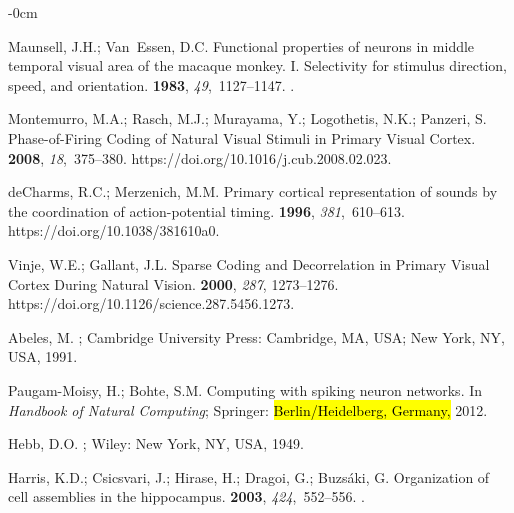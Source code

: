 \documentclass[brainsci, %
               review,accept,pdftex,moreauthors
               ]{Definitions/mdpi}
\begin{document}
\begin{adjustwidth}{-\extralength}{0cm}
\begin{thebibliography}{999}
Maunsell, J.H.; Van~Essen, D.C.
\newblock Functional properties of neurons in middle temporal visual area of
  the macaque monkey. {I}. {Selectivity} for stimulus direction, speed, and
  orientation.
 {\bf 1983}, {\em 49},~1127--1147.
.

Montemurro, M.A.; Rasch, M.J.; Murayama, Y.; Logothetis, N.K.; Panzeri, S.
\newblock Phase-of-{Firing} {Coding} of {Natural} {Visual} {Stimuli} in
  {Primary} {Visual} {Cortex}.
 {\bf 2008}, {\em 18},~375--380.
  {{https://doi.org/10.1016/j.cub.2008.02.023}}.

deCharms, R.C.; Merzenich, M.M.
\newblock Primary cortical representation of sounds by the coordination of
  action-potential timing.
 {\bf 1996}, {\em 381},~610--613.
  {{https://doi.org/10.1038/381610a0}}.

Vinje, W.E.; Gallant, J.L.
\newblock Sparse {Coding} and {Decorrelation} in {Primary} {Visual} {Cortex}
  {During} {Natural} {Vision}.
 {\bf 2000}, {\em 287}, 1273--1276.
  {{https://doi.org/10.1126/science.287.5456.1273}}.

Abeles, M.
; Cambridge
  University Press: Cambridge, MA, USA; New York, NY, USA, 1991.

Paugam-Moisy, H.; Bohte, S.M.
\newblock Computing with spiking neuron networks. In {\em Handbook of Natural
  Computing}; Springer:  \hl{Berlin/Heidelberg, Germany,} %
  2012.

Hebb, D.O.
;
  Wiley: New York, NY, USA, 1949.

Harris, K.D.; Csicsvari, J.; Hirase, H.; Dragoi, G.; Buzsáki, G.
\newblock Organization of cell assemblies in the hippocampus.
 {\bf 2003}, {\em 424},~552--556.
.


\end{thebibliography}
\end{adjustwidth}
\end{document}
